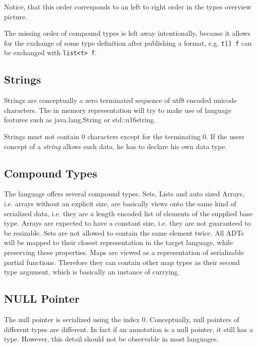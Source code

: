 \documentclass[a4paper,10pt]{article}
\begin{document}
Notice, that this order corresponds to an left to right order in the types overview picture.

The missing order of compound types is left away intentionally, because it allows for the exchange of some type definition after publishing a format, e.g. \verb/t[] f/ can be exchanged with \verb/list<t> f/.


\subsection{Strings}



Strings are conceptually a zero terminated sequence of utf8 encoded unicode characters. The in memory representation will try to make use of language features such as java.lang.String or std::u16string.

Strings must not contain 0 characters except for the terminating 0. If the users concept of a \textit{string} allows such data, he has to declare his own data type.

\subsection{Compound Types}

The language offers several compound types. Sets, Lists and auto sized Arrays, i.e. arrays without an explicit size, are basically views onto the same kind of serialized data, i.e. they are a length encoded list of elements of the supplied base type. Arrays are expected to have a constant size, i.e. they are not guaranteed to be resizable. Sets are not allowed to contain the same element twice.
All ADTs will be mapped to their closest representation in the target language, while preserving these properties.
Maps are viewed as a representation of serializable partial functions. Therefore they can contain other map types as their second type argument, which is basically an instance of currying.

\subsection{NULL Pointer}

The null pointer is serialized using the index 0. Conceptually, null pointers of different types are different. In fact if an annotation is a null pointer, it still has a type. However, this detail should not be observable in most languages.
\end{document}
